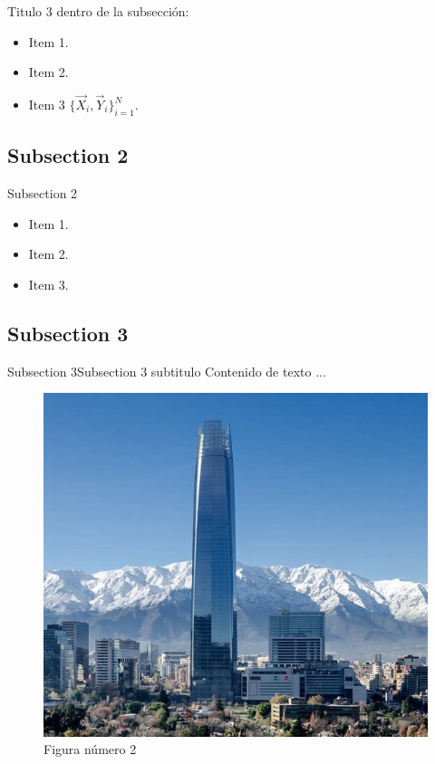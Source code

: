 \documentclass{beamer}
\begin{document}
\begin{frame}[shrink]{Titulo 3 dentro de la subsección:} 
\begin{itemize}
    \item Item 1.
    \item Item 2.
    \item Item 3 $\{\vec{X}_{i}, \vec{Y}_{i}\}_{i=1}^{N}$.
\end{itemize}
\end{frame}

\subsection{Subsection 2}
\begin{frame}{Subsection 2}
\begin{itemize}
    \item Item 1.
    \item Item 2.\cite{CVision}
    \item Item 3.
\end{itemize}
\end{frame}


\subsection{Subsection 3}
\begin{frame}{Subsection 3}{Subsection 3 subtitulo}
Contenido de texto ...
\pause
\begin{figure}[H]
    \includegraphics[scale=0.2]{figura2.png}
    \caption{Figura número 2}
\end{figure}
\end{frame}
\end{document}
